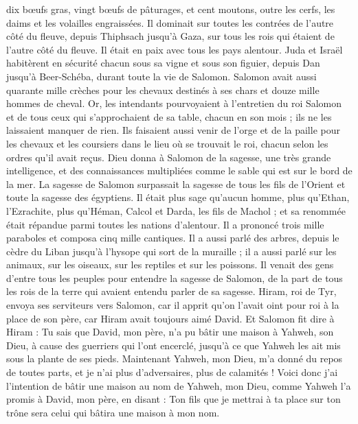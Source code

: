 \begin{multicols}{2}
dix bœufs gras, vingt bœufs de pâturages, et cent moutons, outre les cerfs, les daims et les volailles engraissées.
Il dominait sur toutes les contrées de l’autre côté du fleuve, depuis Thiphsach jusqu'à Gaza, sur tous les rois qui étaient de l’autre côté du fleuve. Il était en paix avec tous les pays alentour.
Juda et Israël habitèrent en sécurité chacun sous sa vigne et sous son figuier, depuis Dan jusqu'à Beer-Schéba, durant toute la vie de Salomon.
Salomon avait aussi quarante mille crèches pour les chevaux destinés à ses chars et douze mille hommes de cheval.
Or, les intendants pourvoyaient à l’entretien du roi Salomon et de tous ceux qui s'approchaient de sa table, chacun en son mois ; ils ne les laissaient manquer de rien.
Ils faisaient aussi venir de l'orge et de la paille pour les chevaux et les coursiers dans le lieu où se trouvait le roi, chacun selon les ordres qu'il avait reçus.
Dieu donna à Salomon de la sagesse, une très grande intelligence, et des connaissances multipliées comme le sable qui est sur le bord de la mer.
La sagesse de Salomon surpassait la sagesse de tous les fils de l’Orient et toute la sagesse des égyptiens.
Il était plus sage qu’aucun homme, plus qu'Ethan, l’Ezrachite, plus qu'Héman, Calcol et Darda, les fils de Machol ; et sa renommée était répandue parmi toutes les nations d'alentour.
Il a prononcé trois mille paraboles et composa cinq mille cantiques.
Il a aussi parlé des arbres, depuis le cèdre du Liban jusqu'à l'hysope qui sort de la muraille ; il a aussi parlé sur les animaux, sur les oiseaux, sur les reptiles et sur les poissons.
Il venait des gens d'entre tous les peuples pour entendre la sagesse de Salomon, de la part de tous les rois de la terre qui avaient entendu parler de sa sagesse.
\VerseOne{}Hiram, roi de Tyr, envoya ses serviteurs vers Salomon, car il apprit qu'on l'avait oint pour roi à la place de son père, car Hiram avait toujours aimé David.
Et Salomon fit dire à Hiram :
Tu sais que David, mon père, n'a pu bâtir une maison à Yahweh, son Dieu, à cause des guerriers qui l'ont encerclé, jusqu'à ce que Yahweh les ait mis sous la plante de ses pieds.
Maintenant Yahweh, mon Dieu, m'a donné du repos de toutes parts, et je n'ai plus d’adversaires, plus de calamités !
Voici donc j’ai l’intention de bâtir une maison au nom de Yahweh, mon Dieu, comme Yahweh l’a promis à David, mon père, en disant : Ton fils que je mettrai à ta place sur ton trône sera celui qui bâtira une maison à mon nom.

\end{multicols}
